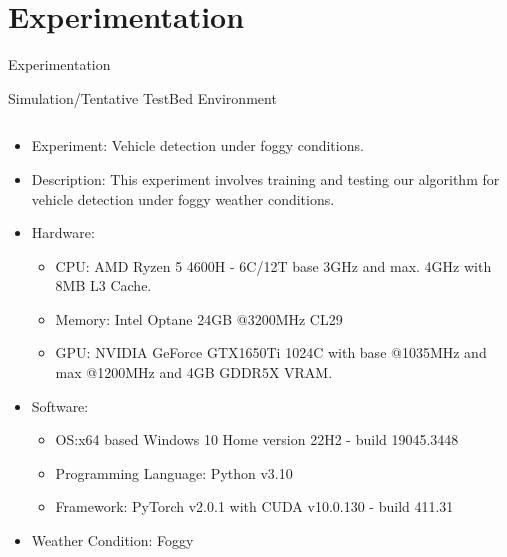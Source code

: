\documentclass[10pt,aspectratio=169,t]{beamer}
\begin{document}
\section{Experimentation}
\begin{frame}[allowframebreaks]{Experimentation}

\vspace{-0.25cm}
\begin{block}{Simulation/Tentative TestBed Environment}
\end{block}
\begin{columns}
\begin{column}{1\textwidth}
\vspace{-0.5cm}
\begin{itemize}
\justifying
\item Experiment: Vehicle detection under foggy conditions. 
\item Description: This experiment involves training and testing our algorithm for vehicle detection under foggy weather conditions.
\item Hardware:
\begin{itemize}
    \item CPU: AMD Ryzen 5 4600H - 6C/12T base 3GHz and max. 4GHz with 8MB L3 Cache.
    \item Memory: Intel Optane 24GB @3200MHz CL29
    \item GPU: NVIDIA GeForce GTX1650Ti 1024C with base @1035MHz and max @1200MHz and 4GB GDDR5X VRAM.
\end{itemize}
\item Software:
\begin{itemize}
    \item OS:x64 based Windows 10 Home version 22H2 - build 19045.3448
    \item Programming Language: Python v3.10
    \item Framework: PyTorch v2.0.1 with CUDA v10.0.130 - build 411.31
\end{itemize}
\item Weather Condition: Foggy
\end{itemize}
\end{column}
\end{columns}


\end{frame}
\end{document}
